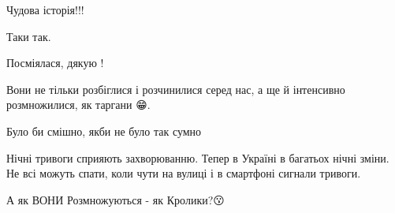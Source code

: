  
 
 
 
 

\qqSecCmt


Чудова історія!!!


Таки так.


Посміялася, дякую !


Вони не тільки розбіглися і розчинилися серед нас, а ще й інтенсивно розмножилися, як таргани 😁.


Було би смішно, якби не було так сумно


Нічні тривоги сприяють захворюванню. Тепер в Україні в багатьох нічні зміни. Не
всі можуть спати, коли чути на вулиці і в смартфоні сигнали тривоги.


А як ВОНИ Розмножуються - як Кролики?😗
